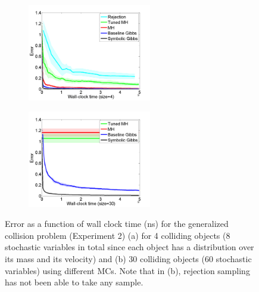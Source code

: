 \documentclass[letterpaper]{article}
\begin{document}
\begin{figure}
\centering
\begin{subfigure}[b]{0.33\textwidth}
     \includegraphics[width=1\linewidth, height=120pt]
{Figs/plots/collision/err-vs-time__param4-shaded.pdf}
     \caption{}
\label{fig:collision-err-vs-time4}
\end{subfigure}
\begin{subfigure}[b]{0.33\textwidth}
     \includegraphics[width=1\linewidth, height=120pt]
{Figs/plots/collision/err-vs-time__param30-shaded.pdf}
     \caption{}
\label{fig:collision-err-vs-time30}
\end{subfigure}
\begin{minipage}[b]{0.33\textwidth}
      \caption{Error %
as a function of wall clock time (ns) for the generalized collision problem (Experiment 2) 
(a) for 4 colliding objects (8 stochastic variables in total since each object has a distribution over its mass and its velocity) and (b) 30 colliding objects (60 stochastic variables)
using different MCs. Note that in (b), rejection sampling has not been able to take any sample.}
      \label{fig:dummy}
    \end{minipage}
\end{figure}
\end{document}
